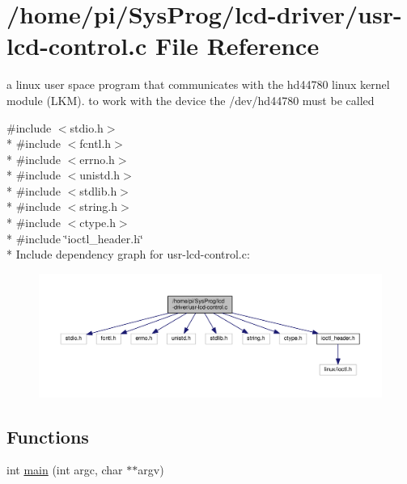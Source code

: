 \hypertarget{usr-lcd-control_8c}{\section{/home/pi/\+Sys\+Prog/lcd-\/driver/usr-\/lcd-\/control.c File Reference}
\label{usr-lcd-control_8c}
}


a linux user space program that communicates with the hd44780 linux kernel module (L\+K\+M). to work with the device the /dev/hd44780 must be called  


{\ttfamily \#include $<$stdio.\+h$>$}\\*
{\ttfamily \#include $<$fcntl.\+h$>$}\\*
{\ttfamily \#include $<$errno.\+h$>$}\\*
{\ttfamily \#include $<$unistd.\+h$>$}\\*
{\ttfamily \#include $<$stdlib.\+h$>$}\\*
{\ttfamily \#include $<$string.\+h$>$}\\*
{\ttfamily \#include $<$ctype.\+h$>$}\\*
{\ttfamily \#include \char`\"{}ioctl\+\_\+header.\+h\char`\"{}}\\*
Include dependency graph for usr-\/lcd-\/control.c\+:
\nopagebreak
\begin{figure}[H]
\begin{center}
\leavevmode
\includegraphics[width=350pt]{usr-lcd-control_8c__incl}
\end{center}
\end{figure}
\subsection*{Functions}
\begin{DoxyCompactItemize}
\item 
int \hyperlink{usr-lcd-control_8c_a3c04138a5bfe5d72780bb7e82a18e627}{main} (int argc, char $\ast$$\ast$argv)
\end{DoxyCompactItemize}


